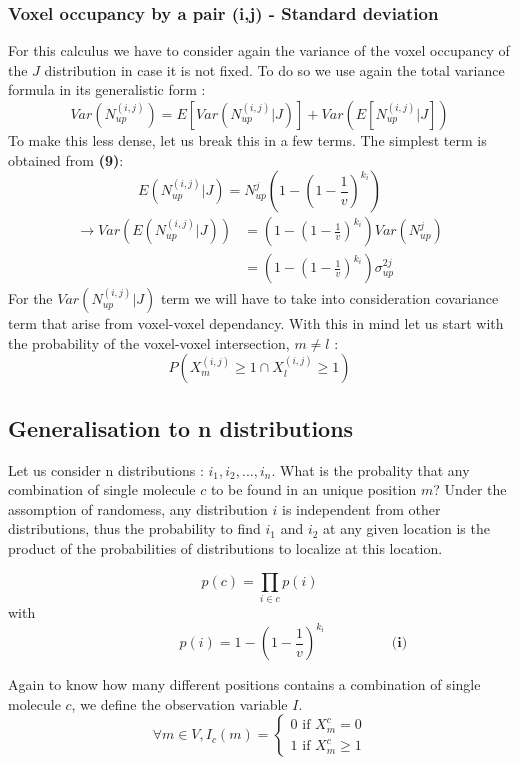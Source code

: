\documentclass{article}
\begin{document}
\subsubsection{Voxel occupancy by a pair (i,j) - Standard deviation}
For this calculus we have to consider again the variance of the voxel occupancy of the $J$ distribution in case it is not fixed. To do so we use again
the total variance formula in its generalistic form :
\[
    Var(N^{(i,j)}_{up}) = E[Var(N^{(i,j)}_{up}|J)] + Var(E[N^{(i,j)}_{up}|J])
\]
To make this less dense, let us break this in a few terms.\newline
The simplest term is obtained from \textbf{(9)}:
\[
E(N^{(i,j)}_{up}|J) = N^j_{up}(1-(1-\frac{1}{v})^{k_i})
\]
\[\begin{split}
    \rightarrow Var(E(N^{(i,j)}_{up}|J)) &= (1-(1-\frac{1}{v})^{k_i})Var(N^j_{up}) \\
    &=(1-(1-\frac{1}{v})^{k_i})\sigma^{2j}_{up}
\end{split}
\]
For the $Var(N^{(i,j)}_{up}|J)$ term we will have to take into consideration covariance term that arise from voxel-voxel dependancy. With this in mind
let us start with the probability of the voxel-voxel intersection, $m \neq l$ :
\[
P(X^{(i,j)}_m \geq 1 \cap X^{(i,j)}_l \geq 1)
\]









\newpage
\subsection{Generalisation to n distributions}

Let us consider n distributions : $i_1, i_2, ..., i_n$. What is the probality that any combination of single molecule $c$ to be found in an unique position $m$?
Under the assomption of randomess, any distribution $i$ is independent from other distributions, thus the probability to find $i_1$ and $i_2$ at any given
location is the product of the probabilities of distributions to localize at this location.

\[
p(c) = \prod_{i \in c}p(i)
\]
with 
\begin{equation}
\hspace{2cm} p(i) = 1-(1-\frac{1}{v})^{k_i} \hspace{2cm} \textbf{(i)}
\end{equation}

Again to know how many different positions contains a combination of single molecule $c$, we define the observation variable $I$.
\[
\forall m \in V, I_c(m) = \begin{cases}
    0 \text{ if } X^c_m = 0 \\
    1 \text{ if } X^c_m \geq 1
\end{cases}
\]



\begin{figure}[h]
\centering
\end{figure}
\end{document}
